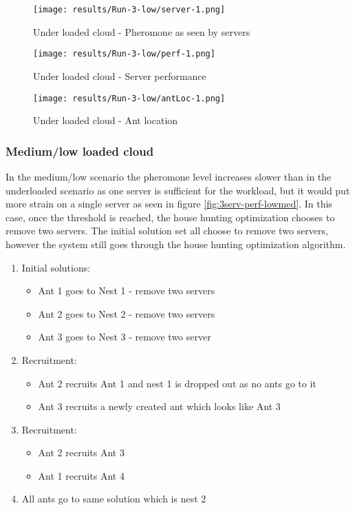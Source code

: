 \begin{figure}
	\centering
		\texttt{[image: results/Run-3-low/server-1.png]}
	\caption{Under loaded cloud - Pheromone as seen by servers}
	\label{fig:3serv-pher-low}
\end{figure}

\begin{figure}
	\centering
		\texttt{[image: results/Run-3-low/perf-1.png]}
	\caption{Under loaded cloud - Server performance}
	\label{fig:3serv-perf-low}
\end{figure}

\begin{figure}
	\centering
		\texttt{[image: results/Run-3-low/antLoc-1.png]}
	\caption{Under loaded cloud - Ant location}
	\label{fig:3serv-antloc-low}
\end{figure}

\subsubsection{Medium/low loaded cloud}

In the medium/low scenario the pheromone level increases slower than in the underloaded scenario as one server is sufficient for the workload, but it would put more strain on a single server as seen in figure \ref{fig:3serv-perf-lowmed}. In this case, once the threshold is reached, the house hunting optimization chooses to remove two servers. The initial solution set all choose to remove two servers, however the system still goes through the house hunting optimization algorithm.

\begin{enumerate}
	\item Initial solutions: 
	\begin{itemize}
		\item Ant 1 goes to Nest 1 - remove two servers
		\item Ant 2 goes to Nest 2 - remove two servers
		\item Ant 3 goes to Nest 3 - remove two server
	\end{itemize}
	\item Recruitment:
	\begin{itemize}
		\item Ant 2 recruits Ant 1 and nest 1 is dropped out as no ants go to it
		\item Ant 3 recruits a newly created ant which looks like Ant 3
	\end{itemize}
	\item Recruitment:
	\begin{itemize}
		\item Ant 2 recruits Ant 3
		\item Ant 1 recruits Ant 4
	\end{itemize}
	\item All ants go to same solution which is nest 2
\end{enumerate}

